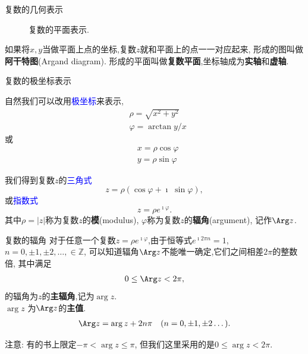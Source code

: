 \documentclass[fontset=windows, chinese, 10pt]{beamer}
\newcommand{\blue}[1]{\textcolor{blue}{#1}}
\begin{document}
  \begin{frame}{复数的几何表示}
    \begin{figure}
      \centering
      \scalebox{1.0}{
        
        }
        \caption{复数的平面表示.} \label{fig:complex_plane}
  \end{figure}
如果将$x,y$当做平面上点的坐标,复数$z$就和平面上的点一一对应起来,
形成的图叫做\textbf{阿干特图}(Argand diagram).
形成的平面叫做{\bf 复数平面},坐标轴成为{\bf 实轴}和{\bf 虚轴}.

\end{frame}

  \begin{frame}{复数的极坐标表示}
    \begin{figure}
        \scalebox{1.0}{
          
          }
    \end{figure}
    自然我们可以改用\blue{极坐标}来表示,
      \begin{align}
          & \rho = \sqrt{x^2 + y^2}\\
          & \varphi = \arctan y/x
      \end{align}
      或
      \begin{align}
          & x = \rho \cos\varphi \\
          & y = \rho \sin\varphi 
      \end{align}
      
      我们得到复数$z$的\blue{三角式}
      \begin{equation}
          z = \rho (\cos\varphi +  \imath\; \sin\varphi) ,
      \end{equation}
      或\blue{指数式}
      \begin{equation}
          z = \rho e^{\imath \varphi} .
      \end{equation}
      其中$\rho = | z| $称为复数$z$的\textbf{模}(modulus), $\varphi$称为复数$z$的\textbf{辐角}(argument), 记作$\Arg z$.
\end{frame}

\begin{frame}{复数的辐角}
  对于任意一个复数$z=\rho e^{\imath \varphi}$,由于恒等式$e^{\imath 2\pi n} = 1$, $n = 0, \pm 1, \pm 2, \dots, \in \mathbb{Z}$,
可以知道辐角$\Arg z$不能唯一确定,它们之间相差$2\pi$的整数倍,
其中满足
\begin{align}
    0 \leq \Arg z < 2\pi ,
\end{align}
的辐角为$z$的\textbf{主辐角},记为$\arg z$. \\$\arg z$ 为$\Arg z$的\textbf{主值}.
\begin{align}
    \Arg z = \arg z + 2 n \pi \quad (n = 0, \pm 1, \pm 2\dots).
\end{align}
\begin{alertblock}{注意: }%
  { 有的书上限定$-\pi < \arg z \leq \pi$, 但我们这里采用的是$0 \leq \arg z < 2\pi$.}
\end{alertblock}

\end{frame}
\end{document}
